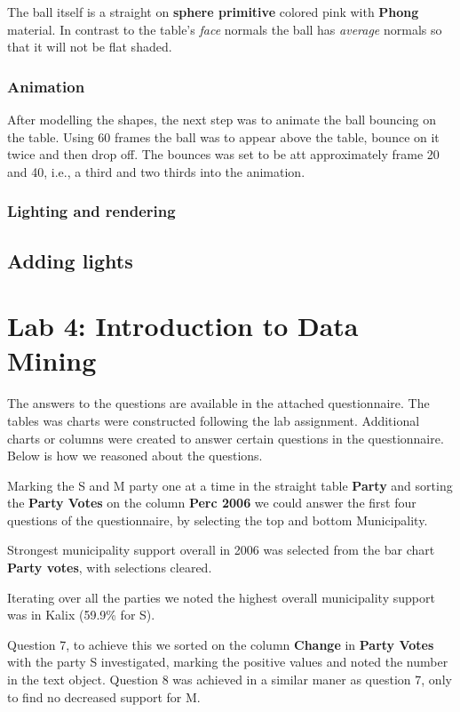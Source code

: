 \documentclass[a4paper]{article}
\begin{document}
The ball itself is a straight on \textbf{sphere primitive} colored pink with \textbf{Phong} material. In contrast to the table's \textit{face} normals the ball has \textit{average} normals so that it will not be flat shaded. 

\subsubsection{Animation}
After modelling the shapes, the next step was to animate the ball bouncing on the table. Using 60 frames the ball was to appear above the table, bounce on it twice and then drop off. The bounces was set to be att approximately frame 20 and 40, i.e., a third and two thirds into the animation. %

\subsubsection{Lighting and rendering}

\subsection{Adding lights} %

\section{Lab 4: Introduction to Data Mining}
The answers to the questions are available in the attached questionnaire. The tables was charts were constructed following the lab assignment. Additional charts or columns were created to answer certain questions in the questionnaire. Below is how we reasoned about the questions.

Marking the S and M party one at a time in the straight table \textbf{Party} and sorting the \textbf{Party Votes} on the column \textbf{Perc 2006} we could answer the first four questions of the questionnaire, by selecting the top and bottom Municipality.

Strongest municipality support overall in 2006 was selected from the bar chart \textbf{Party votes}, with selections cleared. 

Iterating over all the parties we noted the highest overall municipality support was in Kalix (59.9\% for S).

Question 7, to achieve this we sorted on the column \textbf{Change} in \textbf{Party Votes} with the party S investigated, marking the positive values and noted the number in the text object. 
Question 8 was achieved in a similar maner as question 7, only to find no decreased support for M.
\end{document}

